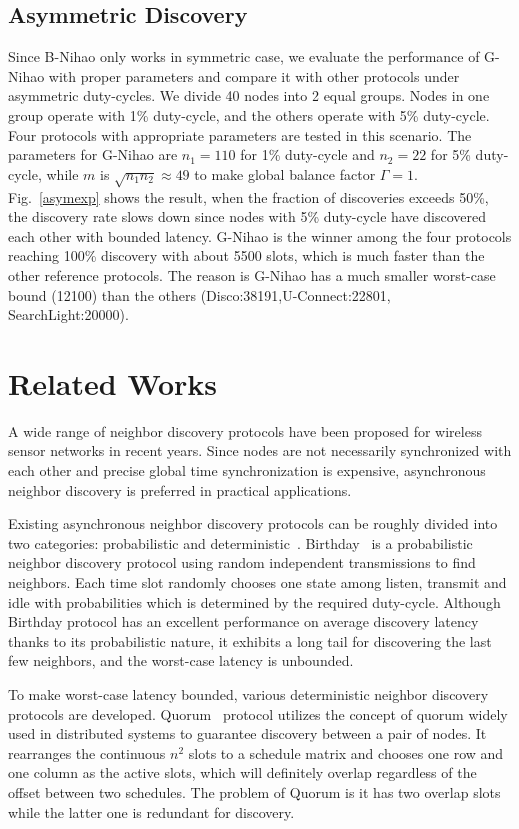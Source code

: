 \documentclass[conference]{IEEEtran}
\begin{document}
\subsection{Asymmetric Discovery}
Since B-Nihao only works in symmetric case, we evaluate the performance of G-Nihao with proper parameters and compare it with other protocols under asymmetric duty-cycles.
We divide 40 nodes into 2 equal groups. Nodes in one group operate with 1\% duty-cycle, and the others operate with 5\% duty-cycle.
Four protocols with appropriate parameters are tested in this scenario. 
The parameters for G-Nihao are $n_1=110$ for 1\% duty-cycle and $n_2=22$ for 5\% duty-cycle, while $m$ is $\sqrt{n_1 n_2} \approx 49$ to make global balance factor $\Gamma=1$.
Fig.~\ref{asymexp} shows the result, when the fraction of discoveries exceeds 50\%,
the discovery rate slows down since nodes with 5\% duty-cycle have discovered each other with bounded latency.
G-Nihao is the winner among the four protocols reaching 100\% discovery with about 5500 slots, which is much faster than the other reference protocols.
The reason is G-Nihao has a much smaller worst-case bound (12100) than the others (Disco:38191,U-Connect:22801, SearchLight:20000).

\section{Related Works}\label{relatedworks}
A wide range of neighbor discovery protocols have been proposed for wireless sensor networks in recent years.
Since nodes are not necessarily synchronized with each other and precise global time synchronization is expensive,
asynchronous neighbor discovery is preferred in practical applications.

Existing asynchronous neighbor discovery protocols can be roughly divided into two categories: probabilistic and deterministic~\cite{sun2014ndsurvey}.
Birthday~\cite{mcglynn2001birthday} is a probabilistic neighbor discovery protocol using random independent transmissions to find neighbors.
Each time slot randomly chooses one state among listen, transmit and idle with probabilities which is determined by the required duty-cycle.
Although Birthday protocol has an excellent performance on average discovery latency thanks to its probabilistic nature, 
it exhibits a long tail for discovering the last few neighbors, and the worst-case latency is unbounded.

To make worst-case latency bounded, various deterministic neighbor discovery protocols are developed.
Quorum~\cite{tseng2003power} protocol utilizes the concept of quorum widely used in distributed systems to guarantee discovery between a pair of nodes.
It rearranges the continuous $n^2$ slots to a schedule matrix and chooses one row and one column as the active slots,
which will definitely overlap regardless of the offset between two schedules.
The problem of Quorum is it has two overlap slots while the latter one is redundant for discovery.
\end{document}
